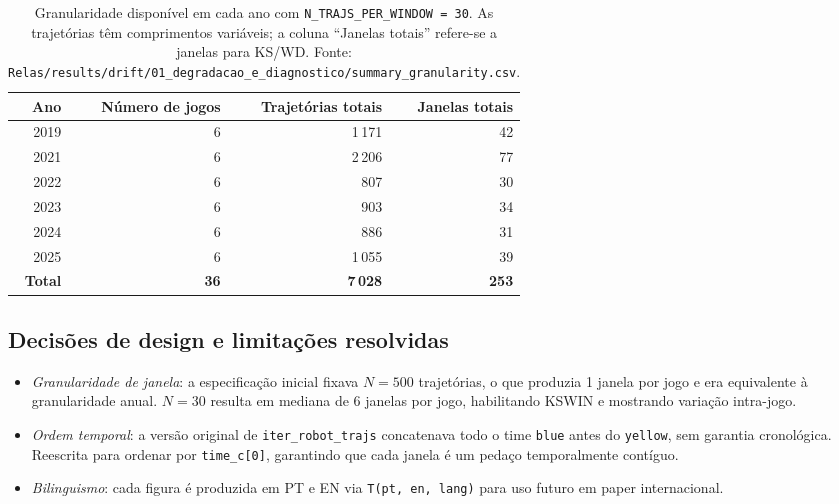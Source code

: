 \documentclass[11pt,a4paper]{article}
\begin{document}
\begin{table}[H]
\centering\small
\begin{tabular}{rrrr}
\toprule
\textbf{Ano} & \textbf{N\'umero de jogos} & \textbf{Trajet\'orias totais} & \textbf{Janelas totais} \\
\midrule
2019 & 6 & 1\,171 & 42 \\
2021 & 6 & 2\,206 & 77 \\
2022 & 6 &   807 & 30 \\
2023 & 6 &   903 & 34 \\
2024 & 6 &   886 & 31 \\
2025 & 6 & 1\,055 & 39 \\
\midrule
\textbf{Total} & \textbf{36} & \textbf{7\,028} & \textbf{253} \\
\bottomrule
\end{tabular}
\caption{Granularidade dispon\'ivel em cada ano com
         \texttt{N\_TRAJS\_PER\_WINDOW = 30}. As trajet\'orias t\^em
         comprimentos vari\'aveis; a coluna ``Janelas totais'' refere-se
         a janelas para KS/WD. Fonte:
         \texttt{Relas/results/drift/01\_degradacao\_e\_diagnostico/summary\_granularity.csv}.}
\label{tab:granularity}
\end{table}

\subsection{Decis\~oes de design e limita\c{c}\~oes resolvidas}

\begin{itemize}[leftmargin=1.4em,itemsep=2pt]
    \item \emph{Granularidade de janela}: a especifica\c{c}\~ao inicial
          fixava $N=500$ trajet\'orias, o que produzia 1 janela por jogo
          e era equivalente \`a granularidade anual. $N{=}30$ resulta em
          mediana de 6 janelas por jogo, habilitando KSWIN e mostrando
          varia\c{c}\~ao intra-jogo.
    \item \emph{Ordem temporal}: a vers\~ao original de
          \texttt{iter\_robot\_trajs} concatenava todo o time \texttt{blue}
          antes do \texttt{yellow}, sem garantia cronol\'ogica. Reescrita
          para ordenar por \texttt{time\_c[0]}, garantindo que cada janela
          \'e um peda\c{c}o temporalmente cont\'iguo.
    \item \emph{Bilinguismo}: cada figura \'e produzida em PT e EN via
          \texttt{T(pt, en, lang)} para uso futuro em paper internacional.
\end{itemize}
\end{document}

